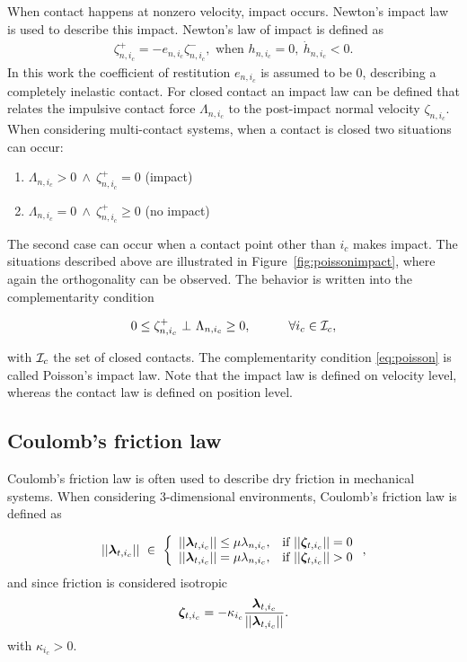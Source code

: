 \documentclass[../DC2017114Bouma.tex]{subfiles}
\begin{document}
When contact happens at nonzero velocity, impact occurs. Newton's impact law is used to describe this impact. Newton's law of impact is defined as
\begin{align}
\zeta^+_{n,i_c} = -e_{n,i_c}\zeta^-_{n,i_c},\text{ when }h_{n,i_c}=0,\ \dot{h}_{n,i_c}<0.
\end{align}
In this work the coefficient of restitution $e_{n,i_c}$ is assumed to be $0$, describing a completely inelastic contact. For closed contact an impact law can be defined that relates the impulsive contact force $\Lambda_{n,i_c}$ to the post-impact normal velocity $\zeta_{n,i_c}$. When considering multi-contact systems, when a contact is closed two situations can occur:
\begin{enumerate}
\item $\Lambda_{n,i_c} > 0\ \wedge\ \zeta^+_{n,i_c} = 0$ (impact)
\item $\Lambda_{n,i_c} = 0\ \wedge\ \zeta^+_{n,i_c} \geq 0$ (no impact)
\end{enumerate}
The second case can occur when a contact point other than $i_c$ makes impact. The situations described above are illustrated in Figure~\ref{fig:poissonimpact}, where again the orthogonality can be observed. The behavior is written into the complementarity condition

\begin{align}
0\leq \zeta^+_{n,i_c}\ \bot\ \Lambda_{n,i_c} \geq 0,\quad  \qquad \forall i_c\in\mathcal{I}_c,\label{eq:poisson}
\end{align}

with $\mathcal{I}_c$ the set of closed contacts. The complementarity condition \eqref{eq:poisson} is called Poisson's impact law. Note that the impact law is defined on velocity level, whereas the contact law is defined on position level.
\subsection{Coulomb's friction law}
Coulomb's friction law is often used to describe dry friction in mechanical systems. When considering 3-dimensional environments, Coulomb's friction law is defined as 

\begin{align}
||\lambdab_{t,i_c}||\ \in\ \left\{ \begin{array}{ll}
||\lambdab_{t,i_c}||\leq\mu\lambda_{n,i_c}, &\text{if }||\zetab_{t,i_c}||=0\\
||\lambdab_{t,i_c}|| = \mu\lambda_{n,i_c}, &\text{if }||\zetab_{t,i_c}||>0
\end{array}\right.,\label{eq:frictionlen}
\end{align}
and since friction is considered isotropic
\begin{align}
\boldsymbol{\zeta}_{t,i_c} = -\kappa_{i_c}\frac{\boldsymbol{\lambda}_{t,i_c}}{||\boldsymbol{\lambda}_{t,i_c}||}.\label{eq:frictiondir}
\end{align}
with $\kappa_{i_c}>0$.
\end{document}
